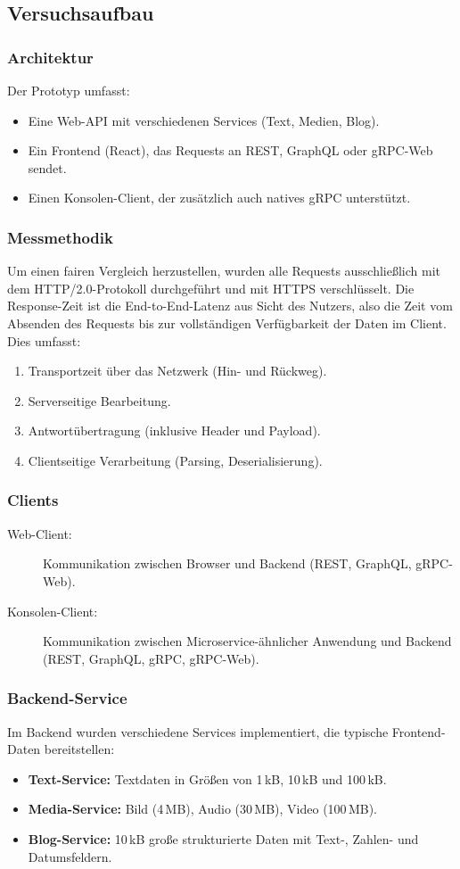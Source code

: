 \subsection{Versuchsaufbau}
\subsubsection{Architektur}
Der Prototyp umfasst:
\begin{itemize}
	\item Eine Web-API mit verschiedenen Services (Text, Medien, Blog).
	\item Ein Frontend (React), das Requests an REST, GraphQL oder gRPC-Web sendet.
	\item Einen Konsolen-Client, der zusätzlich auch natives gRPC unterstützt.
\end{itemize}

\subsubsection{Messmethodik}
Um einen fairen Vergleich herzustellen, wurden alle Requests ausschließlich mit dem HTTP/2.0-Protokoll durchgeführt und mit HTTPS verschlüsselt.
Die Response-Zeit ist die End-to-End-Latenz aus Sicht des Nutzers, also die Zeit vom Absenden des Requests bis zur vollständigen Verfügbarkeit der Daten im Client.
Dies umfasst:
\begin{enumerate}
	\item Transportzeit über das Netzwerk (Hin- und Rückweg).
	\item Serverseitige Bearbeitung.
	\item Antwortübertragung (inklusive Header und Payload).
	\item Clientseitige Verarbeitung (Parsing, Deserialisierung).
\end{enumerate}

\subsubsection{Clients}
\begin{description}
	\item[Web-Client:] Kommunikation zwischen Browser und Backend (REST, GraphQL, gRPC-Web).
	\item[Konsolen-Client:] Kommunikation zwischen Microservice-ähnlicher Anwendung und Backend (REST, GraphQL, gRPC, gRPC-Web).
\end{description}

\subsubsection{Backend-Service}
Im Backend wurden verschiedene Services implementiert, die typische Frontend-Daten bereitstellen:
\begin{itemize}
	\item \textbf{Text-Service:} Textdaten in Größen von 1\,kB, 10\,kB und 100\,kB.
	\item \textbf{Media-Service:} Bild (4\,MB), Audio (30\,MB), Video (100\,MB).
	\item \textbf{Blog-Service:} 10\,kB große strukturierte Daten mit Text-, Zahlen- und Datumsfeldern.
\end{itemize}


